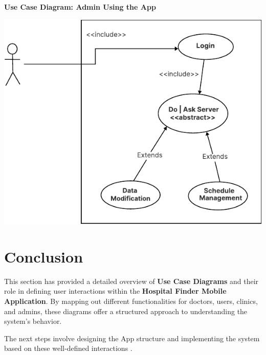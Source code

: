 \documentclass[12pt]{report}
\begin{document}
\vspace{0.5cm}
\noindent \textbf{Use Case Diagram: Admin Using the App}
\begin{center}
	\includegraphics[width=\textwidth]{images/doctorCAS.pdf} %
\end{center}

\section{\textbf{Conclusion}}
\noindent This section has provided a detailed overview of \textbf{Use Case Diagrams} and their role in defining user interactions within the \textbf{Hospital Finder Mobile Application}. By mapping out different functionalities for doctors, users, clinics, and admins, these diagrams offer a structured approach to understanding the system's behavior.

\noindent The next steps involve designing the App structure and implementing the system based on these well-defined interactions .
\end{document}
